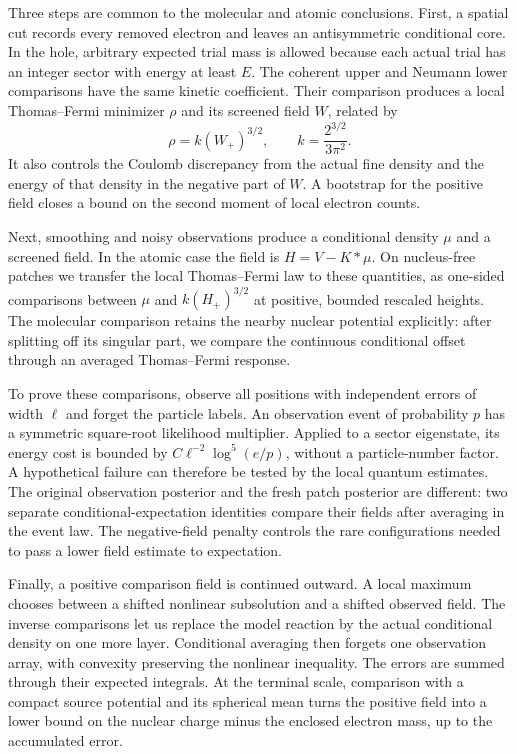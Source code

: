 Three steps are common to the molecular and atomic conclusions. First, a
spatial cut records every removed electron and leaves an antisymmetric
conditional core. In the hole, arbitrary expected trial mass is allowed
because each actual trial has an integer sector with energy at least $E$.
The coherent upper and Neumann lower comparisons have the same kinetic
coefficient. Their comparison produces a local Thomas--Fermi minimizer
$\rho$ and its screened field $W$, related by
\[
 \rho=k(W_+)^{3/2},\qquad k=\frac{2^{3/2}}{3\pi^2}.
\]
It also controls the Coulomb discrepancy from the actual fine density
and the energy of that density in the negative part of $W$. A bootstrap
for the positive field closes a bound on the second moment of local
electron counts.

Next, smoothing and noisy observations produce a conditional density
$\mu$ and a screened field. In the atomic case the field is
$H=V-K*\mu$. On nucleus-free patches we transfer the local Thomas--Fermi
law to these quantities, as one-sided comparisons between $\mu$ and
$k(H_+)^{3/2}$ at positive, bounded rescaled heights. The molecular
comparison retains the nearby nuclear potential explicitly: after
splitting off its singular part, we compare the continuous conditional
offset through an averaged Thomas--Fermi response.

To prove these comparisons, observe all positions with independent errors
of width $\ell$ and forget the particle labels. An observation event of
probability $p$ has a symmetric square-root likelihood multiplier.
Applied to a sector eigenstate, its energy cost is bounded by
$C\ell^{-2}\log^5(e/p)$, without a particle-number factor. A hypothetical
failure can therefore be tested by the local quantum estimates. The
original observation posterior and the fresh patch posterior are
different: two separate conditional-expectation identities compare their
fields after averaging in the event law. The negative-field penalty
controls the rare configurations needed to pass a lower field estimate
to expectation.

Finally, a positive comparison field is continued outward. A local
maximum chooses between a shifted nonlinear subsolution and a shifted
observed field. The inverse comparisons let us replace the model reaction
by the actual conditional density on one more layer. Conditional averaging
then forgets one observation array, with convexity preserving the nonlinear
inequality. The errors are summed through their expected integrals. At the
terminal scale, comparison with a compact source potential and its spherical
mean turns the positive field into a lower bound on the nuclear charge
minus the enclosed electron mass, up to the accumulated error.

